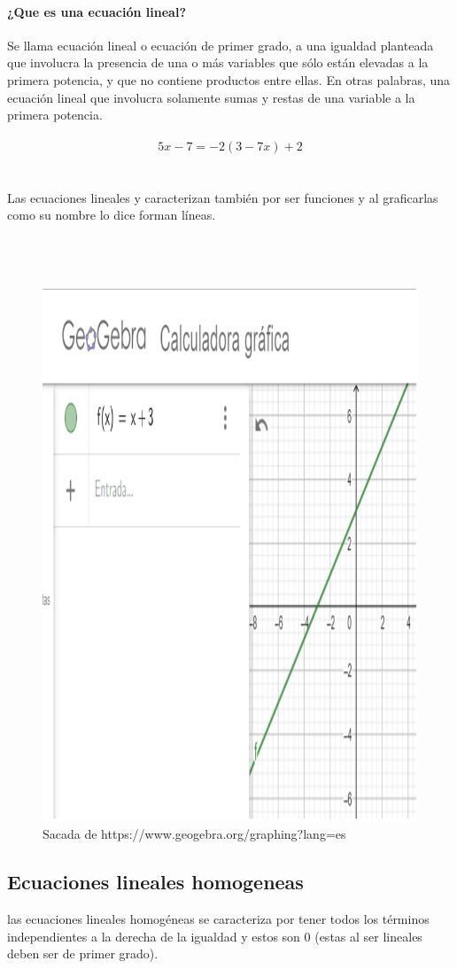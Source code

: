\documentclass{article}
\begin{document}
\paragraph{¿Que es una ecuación lineal?}
Se llama ecuación lineal o ecuación de primer grado, a una igualdad planteada que involucra la presencia de una o más variables que sólo están elevadas a la primera potencia, y que no contiene productos entre ellas. En otras palabras, una ecuación lineal que involucra solamente sumas y restas de una variable a la primera potencia. \cite{edicion3}
\\\\
\begin{equation}
5x-7=-2(3-7x)+2
\end{equation}
\\\\
Las ecuaciones lineales y caracterizan también por ser funciones y al graficarlas como su nombre lo dice forman líneas.
\\\\\\\\
\begin{figure}
    \centering
    \includegraphics[width=0.5 \textwidth]{imagen1.pdf}
    \caption{Sacada de https://www.geogebra.org/graphing?lang=es}
    \label{fig:my_label}
\end{figure}


\subsection{Ecuaciones lineales homogeneas} 
las ecuaciones lineales homogéneas se caracteriza por tener todos los términos independientes a la derecha de la igualdad y estos son 0 (estas al ser lineales deben ser de primer grado).
\end{document}
